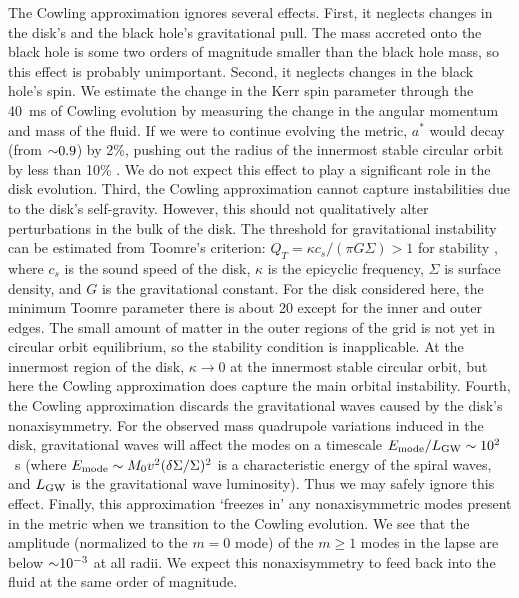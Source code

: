 The Cowling approximation ignores several effects.
First, it neglects changes in the disk's and the black hole's gravitational pull.
The mass accreted onto the black hole is some two orders of magnitude smaller than
the black hole mass, so this effect is probably unimportant.
Second, it neglects changes in the black hole's spin. We estimate the
change in the Kerr spin parameter through the 40~ms of Cowling evolution by
measuring the change in the angular momentum and mass of the fluid.
If we were to continue evolving the metric, $a^*$ would decay
(from $\mathord{\sim}0.9$) by 2\%, pushing out the radius of the innermost stable
circular orbit by less than 10\% \citep{1972ApJ...178..347B}.
We do not expect this effect to play a significant role in the disk evolution.
Third, the Cowling approximation cannot capture instabilities
due to the disk's self-gravity. However, this should not qualitatively
alter perturbations in the bulk of the disk.
The threshold for gravitational instability can be estimated from Toomre's
criterion:  $Q_T=\kappa c_s/(\pi G\Sigma) >1$ for stability
\citep{1960AnAp...23..979S,1964ApJ...139.1217T}, where $c_s$ is the sound
speed of the disk, $\kappa$ is the epicyclic frequency, 
$\Sigma$ is surface density, and $G$ is the gravitational constant.  For
the disk considered here, the minimum Toomre parameter there is about 20
except for the inner and outer edges.  The small amount of matter in
the outer regions of the grid is not yet in circular orbit equilibrium,
so the stability condition is inapplicable.  At the innermost region
of the disk, $\kappa\rightarrow 0$ at the innermost stable circular
orbit, but here the Cowling approximation does capture
the main orbital instability.
Fourth, the Cowling approximation discards the gravitational
waves caused by the disk's nonaxisymmetry.  For the observed mass
quadrupole variations induced in the disk, gravitational waves will
affect the modes on a timescale $E_{\rm mode}/L_{\rm GW}\sim 10^2$~s
(where $E_{\rm mode}\sim M_0 v^2(\delta\Sigma/\Sigma)^2$ is a
characteristic energy of the spiral waves, and
$L_{\rm GW}$ is the gravitational wave luminosity).
Thus we may safely ignore this effect.
Finally, this approximation `freezes in' any nonaxisymmetric modes present
in the metric when we transition to the Cowling evolution.
We see that the amplitude (normalized to the $m=0$ mode) of the $m\geq1$ modes
in the lapse are below $\mathord{\sim}10^{-3}$ at all radii. We expect this
nonaxisymmetry to feed back into the fluid at the same order of magnitude.


